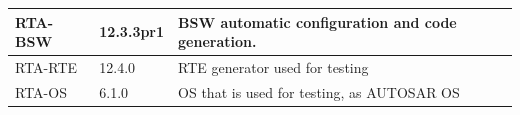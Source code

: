 \begin{longtable}{|l|l|l|}
\begin{minipage}{0.18\linewidth}\raggedright\vspace{.75ex}RTA-BSW\vspace{.75ex}\end{minipage} & \begin{minipage}{0.18\linewidth}\raggedright\vspace{.75ex}12.3.3pr1\vspace{.75ex}\end{minipage} & \begin{minipage}{0.55\linewidth}\raggedright\vspace{.75ex}BSW automatic configuration and code generation.\vspace{.75ex}\end{minipage}\\\hline
\begin{minipage}{0.18\linewidth}\raggedright\vspace{.75ex}RTA-RTE\vspace{.75ex}\end{minipage} & \begin{minipage}{0.18\linewidth}\raggedright\vspace{.75ex}12.4.0\vspace{.75ex}\end{minipage} & \begin{minipage}{0.55\linewidth}\raggedright\vspace{.75ex}RTE generator used for testing\vspace{.75ex}\end{minipage}\\\hline
\begin{minipage}{0.18\linewidth}\raggedright\vspace{.75ex}RTA-OS\vspace{.75ex}\end{minipage} & \begin{minipage}{0.18\linewidth}\raggedright\vspace{.75ex}6.1.0\vspace{.75ex}\end{minipage} & \begin{minipage}{0.55\linewidth}\raggedright\vspace{.75ex} OS that is used for testing, as AUTOSAR OS\vspace{.75ex}\end{minipage}\\\hline

\end{longtable}
